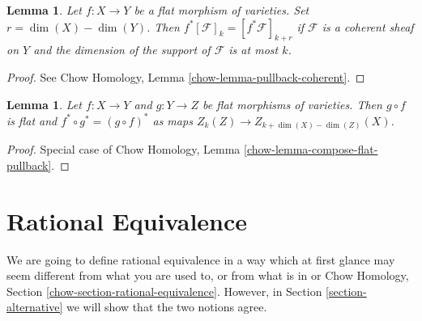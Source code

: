 \documentclass{stacks-project}
\theoremstyle{plain}
\newtheorem{lemma}[subsection]{Lemma}
\theoremstyle{definition}
\theoremstyle{remark}
\numberwithin{equation}{subsection}
\begin{document}
\begin{lemma}
\label{lemma-pullback}
Let $f : X \to Y$ be a flat morphism of varieties. Set $r = \dim(X) - \dim(Y)$.
Then $f^*[\mathcal{F}]_k = [f^*\mathcal{F}]_{k + r}$
if $\mathcal{F}$ is a coherent sheaf on $Y$ and the dimension of the
support of $\mathcal{F}$ is at most $k$.
\end{lemma}

\begin{proof}
See Chow Homology, Lemma \ref{chow-lemma-pullback-coherent}.
\end{proof}

\begin{lemma}
\label{lemma-compose-flat-pullback}
Let $f : X \to Y$ and $g : Y \to Z$ be flat morphisms of
varieties. Then $g \circ f$ is flat and $f^* \circ g^* = (g \circ f)^*$
as maps $Z_k(Z) \to Z_{k + \dim(X) - \dim(Z)}(X)$.
\end{lemma}

\begin{proof}
Special case of Chow Homology, Lemma \ref{chow-lemma-compose-flat-pullback}.
\end{proof}


\section{Rational Equivalence}
\label{section-rational-equivalence}

\noindent
We are going to define rational equivalence in a way which at first
glance may seem different from what you are used to, or from what
is in \cite[Chapter I]{F} or
Chow Homology, Section \ref{chow-section-rational-equivalence}.
However, in Section \ref{section-alternative} we will show that
the two notions agree.
\end{document}
